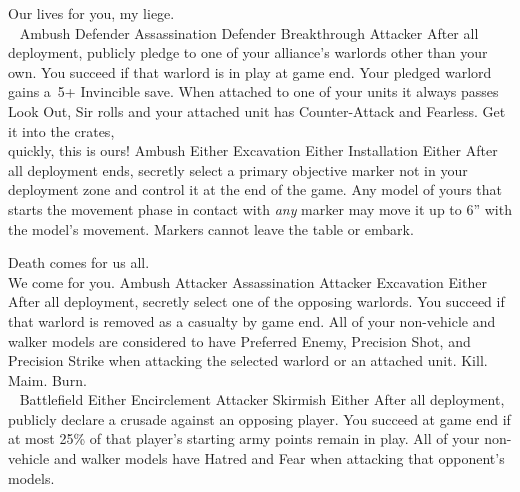 \clearpage
\squelchbackground

\noindent%
%
{Our lives for you, my liege.\\~}%
{Ambush}%
{Defender}%
{Assassination}%
{Defender}%
{Breakthrough}%
{Attacker}%
{After all deployment, publicly pledge to one of your alliance's
  warlords other than your own.  You succeed if that warlord is in
  play at game end.}%
{Your pledged warlord gains a~5+ Invincible save.  When attached to
  one of your units it always passes Look Out, Sir rolls and your
  attached unit has Counter-Attack and Fearless.}
\hfill
%
{Get it into the crates,\\quickly, this is ours!}%
{Ambush}%
{Either}%
{Excavation}%
{Either}%
{Installation}%
{Either}%
{After all deployment ends, secretly select a primary objective marker
  not in your deployment zone and control it at the end of the game.}%
{Any model of yours that starts the movement phase in contact with
  \emph{any} marker may move it up to 6'' with the model's movement.
  Markers cannot leave the table or embark.}


\vfill

\noindent%
%
{Death comes for us all.\\We come for you.}%
{Ambush}%
{Attacker}%
{Assassination}%
{Attacker}%
{Excavation}%
{Either}%
{After all deployment, secretly select one of the opposing warlords.
  You succeed if that warlord is removed as a casualty by game end.}%
{All of your non-vehicle and walker models are considered to have
  Preferred Enemy, Precision Shot, and Precision Strike when attacking
  the selected warlord or an attached unit.}
\hfill
%
{Kill.  Maim.  Burn.\\~}%
{Battlefield}%
{Either}%
{Encirclement}%
{Attacker}%
{Skirmish}%
{Either}%
{After all deployment, publicly declare a crusade against an opposing
  player.  You succeed at game end if at most 25\% of that player's
  starting army points remain in play.}%
{All of your non-vehicle and walker models have Hatred and Fear when
  attacking that opponent's models.}


\pagebreak

